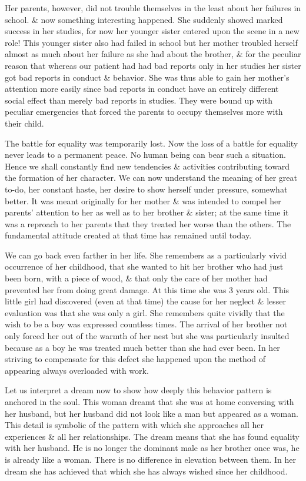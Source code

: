 \documentclass{article}
\begin{document}
Her parents, however, did not trouble themselves in the least about her failures in school. \& now something interesting happened. She suddenly showed marked success in her studies, for now her younger sister entered upon the scene in a new role! This younger sister also had failed in school but her mother troubled herself almost as much about her failure as she had about the brother, \& for the peculiar reason that whereas our patient had had bad reports only in her studies her sister got bad reports in conduct \& behavior. She was thus able to gain her mother's attention more easily since bad reports in conduct have an entirely different social effect than merely bad reports in studies. They were bound up with peculiar emergencies that forced the parents to occupy themselves more with their child.

The battle for equality was temporarily lost. Now the loss of a battle for equality never leads to a permanent peace. No human being can bear such a situation. Hence we shall constantly find new tendencies \& activities contributing toward the formation of her character. We can now understand the meaning of her great to-do, her constant haste, her desire to show herself under pressure, somewhat better. It was meant originally for her mother \& was intended to compel her parents' attention to her as well as to her brother \& sister; at the same time it was a reproach to her parents that they treated her worse than the others. The fundamental attitude created at that time has remained until today.

We can go back even farther in her life. She remembers as a particularly vivid occurrence of her childhood, that she wanted to hit her brother who had just been born, with a piece of wood, \& that only the care of her mother had prevented her from doing great damage. At this time she was 3 years old. This little girl had discovered (even at that time) the cause for her neglect \& lesser evaluation was that she was only a girl. She remembers quite vividly that the wish to be a boy was expressed countless times. The arrival of her brother not only forced her out of the warmth of her nest but she was particularly insulted because as a boy he was treated much better than she had ever been. In her striving to compensate for this defect she happened upon the method of appearing always overloaded with work.

Let us interpret a dream now to show how deeply this behavior pattern is anchored in the soul. This woman dreamt that she was at home conversing with her husband, but her husband did not look like a man but appeared as a woman. This detail is symbolic of the pattern with which she approaches all her experiences \& all her relationships. The dream means that she has found equality with her husband. He is no longer the dominant male as her brother once was, he is already like a woman. There is no difference in elevation between them. In her dream she has achieved that which she has always wished since her childhood.
\end{document}
